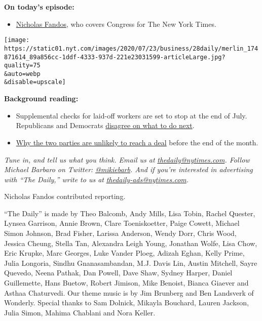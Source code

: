 \textbf{On today's episode:}

\begin{itemize}
\tightlist
\item
  \href{https://www.nytimes.com/by/nicholas-fandos}{Nicholas Fandos},
  who covers Congress for The New York Times.
\end{itemize}

\texttt{[image: https://static01.nyt.com/images/2020/07/23/business/28daily/merlin\_174871614\_89a856cc-1ddf-4333-937d-221e23031599-articleLarge.jpg?quality=75\\\&auto=webp\\\&disable=upscale]}

\textbf{Background reading:}

\begin{itemize}
\item
  Supplemental checks for laid-off workers are set to stop at the end of
  July. Republicans and Democrats
  \href{https://www.nytimes.com/2020/07/23/business/economy/unemployment-benefits.html}{disagree
  on what to do next}.
\item
  \href{https://www.nytimes.com/2020/07/26/us/politics/coronavirus-stimulus-bill-unemployment.html}{Why
  the two parties are unlikely to reach a deal} before the end of the
  month.
\end{itemize}

\emph{Tune in, and tell us what you think. Email us at}
\href{mailto:thedaily@nytimes.com}{\emph{thedaily@nytimes.com}}\emph{.
Follow Michael Barbaro on Twitter:}
\href{https://twitter.com/mikiebarb}{\emph{@mikiebarb}}\emph{. And if
you're interested in advertising with ``The Daily,'' write to us at}
\href{mailto:thedaily-ads@nytimes.com}{\emph{thedaily-ads@nytimes.com}}\emph{.}

Nicholas Fandos contributed reporting.

``The Daily'' is made by Theo Balcomb, Andy Mills, Lisa Tobin, Rachel
Quester, Lynsea Garrison, Annie Brown, Clare Toeniskoetter, Paige
Cowett, Michael Simon Johnson, Brad Fisher, Larissa Anderson, Wendy
Dorr, Chris Wood, Jessica Cheung, Stella Tan, Alexandra Leigh Young,
Jonathan Wolfe, Lisa Chow, Eric Krupke, Marc Georges, Luke Vander Ploeg,
Adizah Eghan, Kelly Prime, Julia Longoria, Sindhu Gnanasambandan, M.J.
Davis Lin, Austin Mitchell, Sayre Quevedo, Neena Pathak, Dan Powell,
Dave Shaw, Sydney Harper, Daniel Guillemette, Hans Buetow, Robert
Jimison, Mike Benoist, Bianca Giaever and Asthaa Chaturvedi. Our theme
music is by Jim Brunberg and Ben Landsverk of Wonderly. Special thanks
to Sam Dolnick, Mikayla Bouchard, Lauren Jackson, Julia Simon, Mahima
Chablani and Nora Keller.

